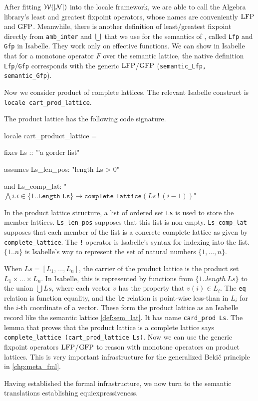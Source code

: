 After fitting $\mathcal W(|\mathcal N|)$ into the locale framework, we are able to call the Algebra library's least and greatest fixpoint operators, whose names are conveniently $\operatorname{LFP}$ and $\operatorname{GFP}$. Meanwhile, there is another definition of least/greatest fixpoint directly from \texttt{amb\_inter} and $\bigcup$ that we use for the semantics of \RGL{}, called \texttt{Lfp} and \texttt{Gfp} in Isabelle. They work only on effective functions. We can show in Isabelle that for a monotone operator $F$ over the semantic lattice, the native definition \texttt{Lfp}/\texttt{Gfp} corresponds with the generic $\operatorname{LFP}$/$\operatorname{GFP}$ (\texttt{semantic\_Lfp, semantic\_Gfp}).

Now we consider product of complete lattices. The relevant Isabelle construct is \texttt{locale cart\_prod\_lattice}.

\begin{bsnippet}
The product lattice has the following code signature.

\label{def:cart_prod_lattice}

\begin{ttfamily}
    locale cart\_product\_lattice =
        
        fixes Ls :: "'a gorder list"
        
        assumes Ls\_len\_pos: "length Ls > 0"
        
        and     Ls\_comp\_lat: "$\mathtt{\bigwedge}i. i\in\{1..\texttt{Length Ls}\} \longrightarrow \texttt{complete\_lattice} (Ls\ \mathtt{!}\ (i-1))$"
\end{ttfamily}
\end{bsnippet}

In the product lattice structure, a list of ordered set \texttt{Ls} is used to store the member lattices. \texttt{Ls\_len\_pos} supposes that this list is non-empty. \texttt{Ls\_comp\_lat} supposes that each member of the list is a concrete complete lattice as given by \texttt{complete\_lattice}. The \texttt{!} operator is Isabelle's syntax for indexing into the list. $\{1..n\}$ is Isabelle's way to represent the set of natural numbers $\{1,\dots,n\}$.

When $Ls = [L_1,\dots,L_n]$, the carrier of the product lattice is the product set $L_1\times\dots\times L_n$. In Isabelle, this is represented by functions from $\{1..length\ Ls\}$ to the union $\bigcup Ls$, where each vector $v$ has the property that $v(i)\in L_i$. The \texttt{eq} relation is function equality, and the \texttt{le} relation is point-wise less-than in $L_i$ for the $i$-th coordinate of a vector. These form the product lattice as an Isabelle record like the semantic lattice \autoref{def:sem_lat}. It has name \texttt{card\_prod Ls}. The lemma that proves that the product lattice is a complete lattice says \texttt{complete\_lattice (cart\_prod\_lattice Ls)}. Now we can use the generic fixpoint operators $\operatorname{LFP}$/$\operatorname{GFP}$ to reason with monotone operators on product lattices. This is very important infrastructure for the generalized Beki\v{c} principle in \autoref{chp:meta_fml}.

Having established the formal infrastructure, we now turn to the semantic translations establishing equiexpressiveness.